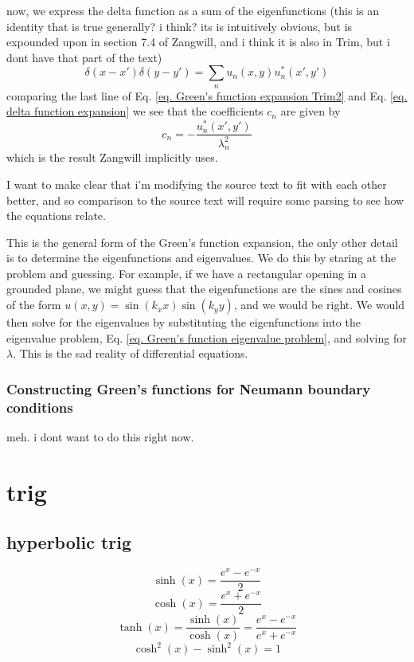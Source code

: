 \documentclass[../../main.tex]{subfiles} %
\begin{document}
now, we express the delta function as a sum of the eigenfunctions (this is an identity that is true generally? i think? its is intuitively obvious, but is expounded upon in section 7.4 of Zangwill, and i think it is also in Trim, but i dont have that part of the text)
\begin{equation}\label{eq. delta function expansion}
    \delta(x-x')\delta(y-y')=\sum_n u_n(x,y)u_n^*(x',y')
\end{equation}
comparing the last line of Eq. \ref{eq. Green's function expansion Trim2} and Eq. \ref{eq. delta function expansion} we see that the coefficients $c_n$ are given by
\begin{equation}\label{eq. Green's function expansion Trim3}
    c_n=-\frac{u_n^*(x',y')}{\lambda_n^2}
\end{equation}
which is the result Zangwill implicitly uses.
\begin{aside}
    I want to make clear that i'm modifying the source text to fit with each other better, and so comparison to the source text will require some parsing to see how the equations relate. 
\end{aside}
This is the general form of the Green's function expansion, the only other detail is to determine the eigenfunctions and eigenvalues. We do this by staring at the problem and guessing. For example, if we have a rectangular opening in a grounded plane, we might guess that the eigenfunctions are the sines and cosines of the form $u(x,y)=\sin(k_xx)\sin(k_yy)$, and we would be right. We would then solve for the eigenvalues by substituting the eigenfunctions into the eigenvalue problem, Eq. \ref{eq. Green's function eigenvalue problem}, and solving for $\lambda$. This is the sad reality of differential equations. 









\subsubsection{Constructing Green's functions for Neumann boundary conditions}
meh. i dont want to do this right now.

\section{trig}

\subsection{hyperbolic trig}
\begin{equation}
    \sinh(x)=\frac{e^x-e^{-x}}{2}
\end{equation}
\begin{equation}
    \cosh(x)=\frac{e^x+e^{-x}}{2}
\end{equation}
\begin{equation}
    \tanh(x)=\frac{\sinh(x)}{\cosh(x)}=\frac{e^x-e^{-x}}{e^x+e^{-x}}
\end{equation}
\begin{equation}
    \cosh^2(x)-\sinh^2(x)=1
\end{equation}
\end{document}
